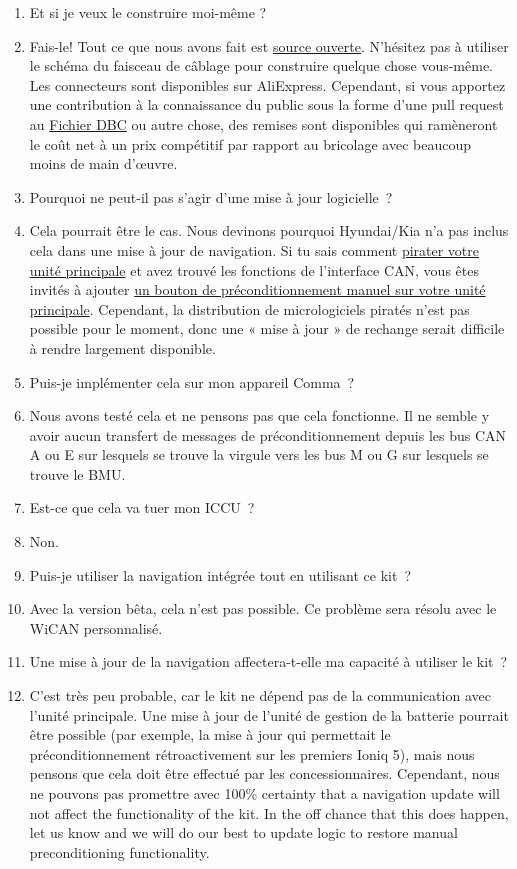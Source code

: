 \documentclass[superscriptaddress,onecolumn,floatfix]{revtex4-2}
\begin{document}
\begin{enumerate}
  \item[Question :] Et si je veux le construire moi-même ?
  \item[UN:] Fais-le! Tout ce que nous avons fait est \href{https://github.com/tylerharvey/Ioniq5_CAN}{source ouverte}. N'hésitez pas à utiliser le schéma du faisceau de câblage pour construire quelque chose vous-même. Les connecteurs sont disponibles sur AliExpress. Cependant, si vous apportez une contribution à la connaissance du public sous la forme d'une pull request au \href{https://github.com/dragz/egmpdbc}{Fichier DBC} ou autre chose, des remises sont disponibles qui ramèneront le coût net à un prix compétitif par rapport au bricolage avec beaucoup moins de main d'œuvre.
  \item[Question :] Pourquoi ne peut-il pas s'agir d'une mise à jour logicielle ?
  \item[UN:] Cela pourrait être le cas. Nous devinons pourquoi Hyundai/Kia n’a pas inclus cela dans une mise à jour de navigation. Si tu sais comment \href{https://discord.gg/zyrngQ5qQ}{pirater votre unité principale} et avez trouvé les fonctions de l'interface CAN, vous êtes invités à ajouter \href{https://www.reddit.com/r/KiaEV6/comments/1jdd56u/comment/mid9xie/}{un bouton de préconditionnement manuel sur votre unité principale}. Cependant, la distribution de micrologiciels piratés n'est pas possible pour le moment, donc une « mise à jour » de rechange serait difficile à rendre largement disponible.
  \item[Question :] Puis-je implémenter cela sur mon appareil Comma ?
  \item[UN:] Nous avons testé cela et ne pensons pas que cela fonctionne. Il ne semble y avoir aucun transfert de messages de préconditionnement depuis les bus CAN A ou E sur lesquels se trouve la virgule vers les bus M ou G sur lesquels se trouve le BMU.
  \item[Question :] Est-ce que cela va tuer mon ICCU ?
  \item[UN:] Non.
  \item[Question :] Puis-je utiliser la navigation intégrée tout en utilisant ce kit ?
  \item[UN:] Avec la version bêta, cela n'est pas possible. Ce problème sera résolu avec le WiCAN personnalisé.
  \item[Question :] Une mise à jour de la navigation affectera-t-elle ma capacité à utiliser le kit ?
  \item[UN:] C'est très peu probable, car le kit ne dépend pas de la communication avec l'unité principale. Une mise à jour de l'unité de gestion de la batterie pourrait être possible (par exemple, la mise à jour qui permettait le préconditionnement rétroactivement sur les premiers Ioniq 5), mais nous pensons que cela doit être effectué par les concessionnaires. Cependant, nous ne pouvons pas promettre avec 100\% certainty that a navigation update will not affect the functionality of the kit. In the off chance that this does happen, let us know and we will do our best to update logic to restore manual preconditioning functionality.

\end{enumerate}
\end{document}
